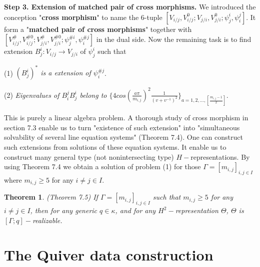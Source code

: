 \def\CTEXPreproc{Created by ctex v0.2.12, don't edit!}\documentclass[11pt]{article}
\newtheorem{thm}{Theorem}[section]
\begin{document}
       \noindent \textbf{Step 3. Extension of matched pair of cross morphisms. } We introduced the conception "\textbf{cross morphism}" to name the 6-tuple $[V_{i/j} , V^{0}_{i/j}; V_{j/i}, V^0 _{j/i}; \psi^i _j , \psi^j _i   ]$. It form a "\textbf{matched pair of cross morphisms}" together with $[V^{\#}_{i/j} , V^{\# 0}_{i/j}; V^{\#}_{j/i}, V^{\# 0} _{j/i}; \psi^{\# i} _j , \psi^{\# j} _i   ]$ in the dual side. Now the remaining task is to find extension $B^i _j : V_{i/j}\rightarrow V_{j/i}$ of $\psi^i _{j}$ such that

\noindent (1) \textit{$(  B^i _j )^{*}$ is a extension of $\psi^{\# j}_i $}.

\noindent (2) \textit{Eigenvalues of $ B^j _i B^i _j  $ belong to  $\{ 4 cos(\frac{a\pi}{m_{i,j}})^2 \frac{1}{(v+v^{-1})^2} \} _{a=1,2,...,[\frac{m_{i,j}-1}{2} ]} $}.

This is purely  a  linear algebra problem. A thorough study of cross morphism in section 7.3 enable us to turn   "existence of such extension" into "simultaneous solvability of several line equation systems" (Theorem 7.4). One can construct such extensions from solutions of these equation systems. It enable us to construct many general type (not nonintersecting type) $H-$representations. 
  By using Theorem 7.4 we obtain a solution of problem (1) for those $\Gamma =[m_{i,j}]_{i,j\in I}$ where $m_{i,j}\geq 5$ for any $i\neq j\in I$.
\begin{thm} (Theorem 7.5) If $\Gamma=[ m_{i,j}]_{i,j\in I} $ such that $m_{i,j}\geq 5$ for any $i\neq j\in I$, then for any generic $q\in\kappa$,  and for any $H^2 -$representation $\Theta$, $\Theta$ is $[\Gamma;q]-$realizable.
\end{thm}







\section{The Quiver data construction}
\end{document}
